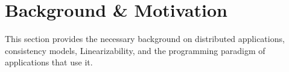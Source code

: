 \section{Background \& Motivation}
\label{sec:motivation}










This section provides the necessary background on distributed applications, consistency models, Linearizability, and the programming paradigm of applications that use it.





